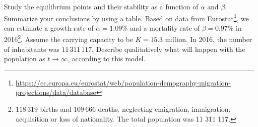 


\begin{Exercise}[name=A simple population model]\label{EX11}



\Question Study the equilibrium points and their stability as a function of $\alpha$ and $\beta$. Summarize your conclusions by using a table.   
\Question Based on data from Eurostat\footnote{\url{https://ec.europa.eu/eurostat/web/population-demography-migration-projections/data/database}}, we can estimate a growth rate of $\alpha=1.09\%$ and a mortality rate of $\beta=0.97\%$ in 2016\footnote{$118\,319$ births and $109\,666$ deaths, neglecting emigration, immigration, acquisition or loss of nationality. The total population was 11 311 117.}. Assume the carrying capacity to be $K=15.3$ million. In 2016, the number of inhabitants was $11\,311\,117$. Describe qualitatively what will happen with the population as $t\rightarrow\infty$, according to this model.

%
%
\end{Exercise}

\newpage

